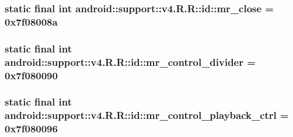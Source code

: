 \hypertarget{classandroid_1_1support_1_1v4_1_1_r_1_1id_50f45b1499cc2a5c957a9bd9ec4d46c0}{
\subsubsection[{mr\_\-close}]{\setlength{\rightskip}{0pt plus 5cm}static final int android::support::v4.R.R::id::mr\_\-close = 0x7f08008a}}
\label{classandroid_1_1support_1_1v4_1_1_r_1_1id_50f45b1499cc2a5c957a9bd9ec4d46c0}


\hypertarget{classandroid_1_1support_1_1v4_1_1_r_1_1id_97b81a2119340e857a193c020651d941}{
\subsubsection[{mr\_\-control\_\-divider}]{\setlength{\rightskip}{0pt plus 5cm}static final int android::support::v4.R.R::id::mr\_\-control\_\-divider = 0x7f080090}}
\label{classandroid_1_1support_1_1v4_1_1_r_1_1id_97b81a2119340e857a193c020651d941}


\hypertarget{classandroid_1_1support_1_1v4_1_1_r_1_1id_dea2dc7e73025ba8425a710410519816}{
\subsubsection[{mr\_\-control\_\-playback\_\-ctrl}]{\setlength{\rightskip}{0pt plus 5cm}static final int android::support::v4.R.R::id::mr\_\-control\_\-playback\_\-ctrl = 0x7f080096}}
\label{classandroid_1_1support_1_1v4_1_1_r_1_1id_dea2dc7e73025ba8425a710410519816}


